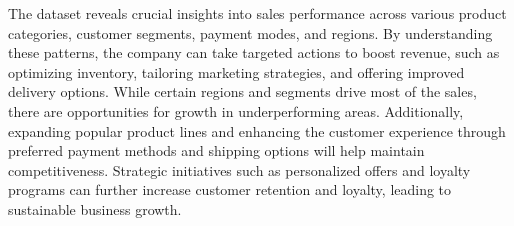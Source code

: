 \documentclass[
]{article}
\begin{document}
The dataset reveals crucial insights into sales performance across
various product categories, customer segments, payment modes, and
regions. By understanding these patterns, the company can take targeted
actions to boost revenue, such as optimizing inventory, tailoring
marketing strategies, and offering improved delivery options. While
certain regions and segments drive most of the sales, there are
opportunities for growth in underperforming areas. Additionally,
expanding popular product lines and enhancing the customer experience
through preferred payment methods and shipping options will help
maintain competitiveness. Strategic initiatives such as personalized
offers and loyalty programs can further increase customer retention and
loyalty, leading to sustainable business growth.
\end{document}
